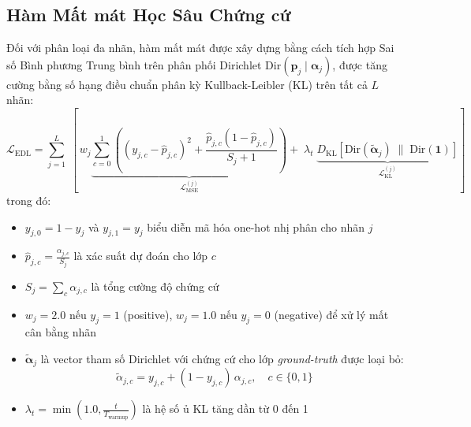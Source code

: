 \documentclass[conference]{IEEEtran}
\begin{document}
\subsection{Hàm Mất mát Học Sâu Chứng cứ} 
Đối với phân loại đa nhãn, hàm mất mát được xây dựng bằng cách tích hợp Sai số Bình phương Trung bình trên phân phối Dirichlet $\mathrm{Dir}(\mathbf{p}_j \mid \boldsymbol{\alpha}_j)$, được tăng cường bằng số hạng điều chuẩn phân kỳ Kullback-Leibler (KL) trên tất cả $L$ nhãn:
\begin{equation}
    \mathcal{L}_{\mathrm{EDL}} = \sum_{j=1}^{L}\; \left[\,
        w_j \underbrace{\sum_{c=0}^{1}\left(
            (y_{j,c} - \hat{p}_{j,c})^2 + \frac{\hat{p}_{j,c}(1 - \hat{p}_{j,c})}{S_j + 1}
        \right)}_{\mathcal{L}_{\mathrm{MSE}}^{(j)}}
        +\; \lambda_t\;
        \underbrace{D_{\mathrm{KL}}\!\left[\mathrm{Dir}(\tilde{\boldsymbol{\alpha}}_j) \;\|\; \mathrm{Dir}(\boldsymbol{1})\right]}_{\mathcal{L}_{\mathrm{KL}}^{(j)}}
    \right]
    \label{eq:edl_loss}
\end{equation}
trong đó:
\begin{itemize}
    \item $y_{j,0} = 1 - y_j$ và $y_{j,1} = y_j$ biểu diễn mã hóa one-hot nhị phân cho nhãn $j$
    \item $\hat{p}_{j,c} = \frac{\alpha_{j,c}}{S_j}$ là xác suất dự đoán cho lớp $c$
    \item $S_j = \sum_c \alpha_{j,c}$ là tổng cường độ chứng cứ
    \item $w_j = 2.0$ nếu $y_j = 1$ (positive), $w_j = 1.0$ nếu $y_j = 0$ (negative) để xử lý mất cân bằng nhãn
    \item $\tilde{\boldsymbol{\alpha}}_j$ là vector tham số Dirichlet với chứng cứ cho lớp \textit{ground-truth} được loại bỏ:
    \begin{equation}
        \tilde{\alpha}_{j,c} = y_{j,c} + (1 - y_{j,c})\,\alpha_{j,c}, \quad c \in \{0, 1\}
        \label{eq:alpha_tilde}
    \end{equation}
    \item $\lambda_t = \min(1.0, \frac{t}{T_{\mathrm{warmup}}})$ là hệ số ủ KL tăng dần từ 0 đến 1
\end{itemize}
\end{document}
